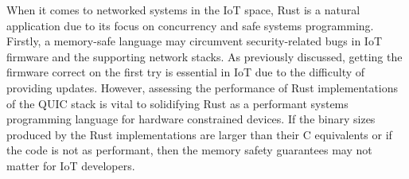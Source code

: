 When it comes to networked systems in the IoT space, Rust is a natural application due to its focus on concurrency and safe systems programming.
Firstly, a memory-safe language may circumvent security-related bugs in IoT firmware and the supporting network stacks.
As previously discussed, getting the firmware correct on the first try is essential in IoT due to the difficulty of providing updates.
However, assessing the performance of Rust implementations of the QUIC stack is vital to solidifying Rust as a performant systems programming language for hardware constrained devices.
If the binary sizes produced by the Rust implementations are larger than their C equivalents or if the code is not as performant, then the memory safety guarantees may not matter for IoT developers.

